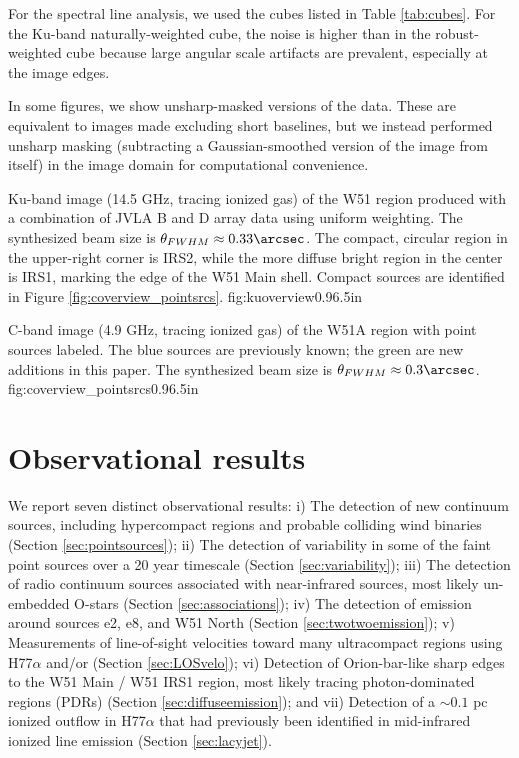 For the spectral line analysis, we used the cubes listed in Table
\ref{tab:cubes}.  For the Ku-band naturally-weighted cube, the noise is higher
than in the robust-weighted cube because large angular scale artifacts are
prevalent, especially at the image edges.

In some figures, we show unsharp-masked versions of the data.  These are
equivalent to images made excluding short baselines, but we instead performed
unsharp masking (subtracting a Gaussian-smoothed version of the image from
itself) in the image domain for computational convenience.



{Ku-band image (14.5 GHz, tracing ionized gas) of the W51 region produced
with a combination of JVLA B and D array data using uniform weighting.  The
synthesized beam size is
$\theta_{FWHM}\approx0.33\arcsec$.
The compact, circular region in the upper-right corner is IRS2, while the more
diffuse bright region in the center is IRS1, marking the edge of the W51 Main
shell.  Compact sources are identified
in Figure \ref{fig:coverview_pointsrcs}.
}
{fig:kuoverview}{0.9}{6.5in}

{C-band  image (4.9 GHz, tracing ionized gas) of the W51A region with point sources labeled.  The
blue sources are previously known; the green are new additions in this paper.
The synthesized beam size is $\theta_{FWHM}\approx0.3\arcsec$.
}
{fig:coverview_pointsrcs}{0.9}{6.5in}


\section{Observational results}
\label{sec:results}
We report seven distinct observational results: 
    i) The detection of new continuum
        sources, including hypercompact \hii regions and probable
        colliding wind binaries (Section \ref{sec:pointsources}); 
    ii) The detection of variability in
        some of the faint point sources over a 20 year timescale (Section \ref{sec:variability});
    iii) The detection of radio continuum
        sources associated with near-infrared sources, most likely un-embedded
        O-stars (Section \ref{sec:associations});
    iv) The detection of \formaldehyde
        \twotwo emission around sources e2, e8, and W51 North (Section \ref{sec:twotwoemission});
    v) Measurements of line-of-sight velocities
        toward many ultracompact \hii regions using H77$\alpha$ and/or
        \formaldehyde (Section \ref{sec:LOSvelo});
    vi) Detection of Orion-bar-like sharp
        edges to the W51 Main / W51 IRS1 \hii region, most likely tracing 
        photon-dominated regions (PDRs) (Section \ref{sec:diffuseemission}); and
    vii)  Detection of a $\sim0.1$ pc ionized
        outflow in H77$\alpha$ that had previously been identified in
        mid-infrared ionized line emission (Section \ref{sec:lacyjet}).

